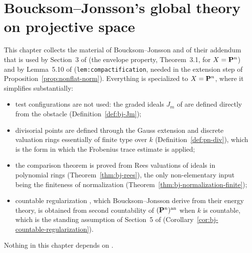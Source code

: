 \section{Boucksom--Jonsson's global theory on projective space}\label{sec:bj22-blueprint}

This chapter collects the material of Boucksom--Jonsson \cite{BJ22} and of their addendum
\cite{BJadd} that is used by Section~3 of \cite{FHX} (the envelope property, Theorem~3.1, for
$X=\mathbf{P}^n$) and by Lemma~5.10 of \cite{FHX} (\texttt{lem:compactification}, needed in the extension step of
Proposition~\ref{prop:nonflat-norm}). Everything is specialized to $X=\mathbf{P}^n$, where it simplifies
substantially:
\begin{itemize}
\item test configurations are not used: the graded ideals $J_m$ of \cite[\S3]{FHX} are defined
directly from the obstacle (Definition~\ref{def:bj-Jm});
\item divisorial points are defined through the Gauss extension and discrete valuation rings
essentially of finite type over $k$ (Definition~\ref{def:pn-div}), which is the form in which the
Frobenius trace estimate \cite[Lemma~3.3]{FHX} is applied;
\item the comparison theorem \cite[Theorem~4.22]{BJ22} is proved from Rees valuations of ideals in
polynomial rings (Theorem~\ref{thm:bj-rees}), the only non-elementary input being the finiteness of
normalization (Theorem~\ref{thm:bj-normalization-finite});
\item countable regularization \cite[Corollary~12.18]{BJ22}, which Boucksom--Jonsson derive from
their energy theory, is obtained from second countability of $(\mathbf{P}^n)^{\mathrm{an}}$ when $k$ is countable,
which is the standing assumption of Section~5 of \cite{FHX} (Corollary~\ref{cor:bj-countable-regularization}).
\end{itemize}
Nothing in this chapter depends on \cite[Theorem~6.21]{BJ22}.

